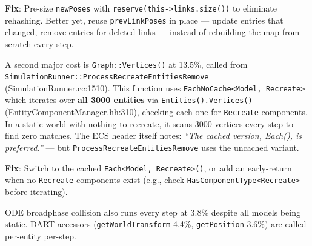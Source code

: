 \documentclass[11pt, a4paper]{article}
\begin{document}
\textbf{Fix}: Pre-size \texttt{newPoses} with \texttt{reserve(this->links.size())} to eliminate rehashing. Better yet, reuse \texttt{prevLinkPoses} in place --- update entries that changed, remove entries for deleted links --- instead of rebuilding the map from scratch every step.

A second major cost is \texttt{Graph::Vertices()} at 13.5\%, called from \texttt{SimulationRunner::ProcessRecreateEntitiesRemove} (SimulationRunner.cc:1510). This function uses \texttt{EachNoCache<Model, Recreate>} which iterates over \textbf{all 3000 entities} via \texttt{Entities().Vertices()} (EntityComponentManager.hh:310), checking each one for \texttt{Recreate} components. In a static world with nothing to recreate, it scans 3000 vertices every step to find zero matches. The ECS header itself notes: \emph{``The cached version, Each(), is preferred.''} --- but \texttt{ProcessRecreateEntitiesRemove} uses the uncached variant.

\textbf{Fix}: Switch to the cached \texttt{Each<Model, Recreate>()}, or add an early-return when no \texttt{Recreate} components exist (e.g., check \texttt{HasComponentType<Recreate>} before iterating).

ODE broadphase collision also runs every step at 3.8\% despite all models being static. DART accessors (\texttt{getWorldTransform} 4.4\%, \texttt{getPosition} 3.6\%) are called per-entity per-step.
\end{document}
